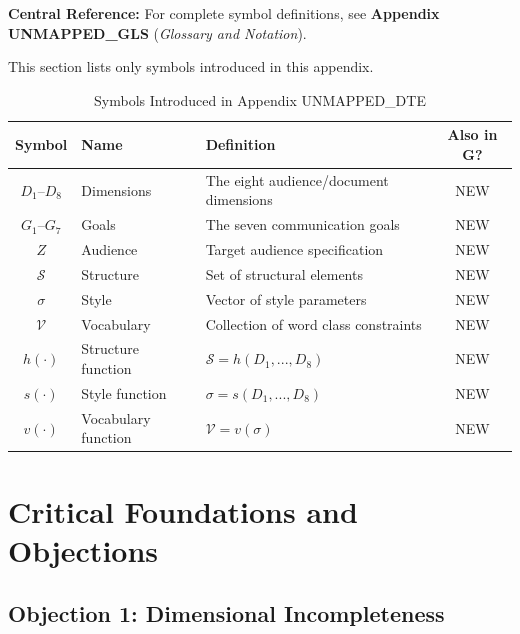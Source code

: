 \begin{tcolorbox}[colback=blue!5!white, colframe=blue!75!black]
\textbf{Central Reference:} For complete symbol definitions, see
\textbf{Appendix UNMAPPED_GLS} (\textit{Glossary and Notation}).

This section lists only symbols introduced in this appendix.
\end{tcolorbox}

\vspace{0.5em}

\begin{table}[htbp]
\centering
\caption{Symbols Introduced in Appendix UNMAPPED_DTE}
\label{tab:doctype-theory-symbols}
\renewcommand{\arraystretch}{1.3}
\begin{tabular}{@{}clp{6cm}c@{}}
\toprule
\textbf{Symbol} & \textbf{Name} & \textbf{Definition} & \textbf{Also in G?} \\
\midrule
$D_1$--$D_8$ & Dimensions & The eight audience/document dimensions & NEW \\
$G_1$--$G_7$ & Goals & The seven communication goals & NEW \\
$Z$ & Audience & Target audience specification & NEW \\
$\mathcal{S}$ & Structure & Set of structural elements & NEW \\
$\sigma$ & Style & Vector of style parameters & NEW \\
$\mathcal{V}$ & Vocabulary & Collection of word class constraints & NEW \\
$h(\cdot)$ & Structure function & $\mathcal{S} = h(D_1,...,D_8)$ & NEW \\
$s(\cdot)$ & Style function & $\sigma = s(D_1,...,D_8)$ & NEW \\
$v(\cdot)$ & Vocabulary function & $\mathcal{V} = v(\sigma)$ & NEW \\
\bottomrule
\end{tabular}
\end{table}


\section{Critical Foundations and Objections}
\label{sec:doctype-theory-critical}

\subsection{Objection 1: Dimensional Incompleteness}

